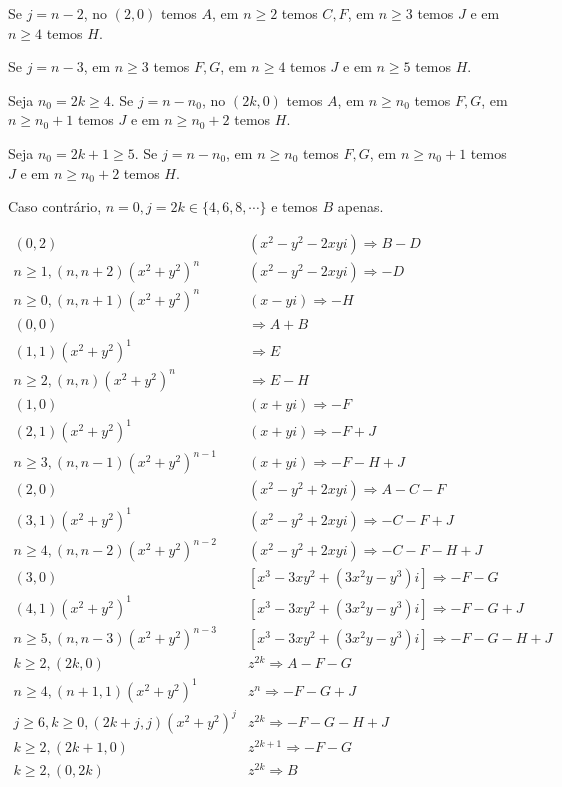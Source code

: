 \documentclass[10pt,a4paper]{article}
\begin{document}
 Se $j = n - 2$, no $(2,0)$ temos $A$, em $n \ge 2$ temos $C, F$, em $n \ge 3$ temos $J$ e em $n \ge 4$ temos $H$.

 Se $j = n - 3$, em $n \ge 3$ temos $F, G$, em $n \ge 4$ temos $J$ e em $n \ge 5$ temos $H$.

 Seja $n_0 = 2k \ge 4$. Se $j = n - n_0$, no $(2k,0)$ temos $A$, em $n \ge n_0$ temos $F, G$, em $n \ge n_0 + 1$ temos $J$ e em $n \ge n_0 + 2$ temos $H$.

 Seja $n_0 = 2k + 1 \ge 5$. Se $j = n - n_0$, em $n \ge n_0$ temos $F, G$, em $n \ge n_0 + 1$ temos $J$ e em $n \ge n_0 + 2$ temos $H$.

 Caso contr\'ario, $n = 0, j = 2k \in \{ 4,6,8,\cdots \}$ e temos $B$ apenas.

 \begin{align*}
 (0,2) &(x^2 - y^2 - 2xyi) \Rightarrow B - D \\
 n \ge 1, (n,n+2) (x^2 + y^2)^n &(x^2 - y^2 - 2xyi) \Rightarrow - D \\
 n \ge 0, (n,n+1) (x^2 + y^2)^n &(x - yi) \Rightarrow - H \\
 (0,0) &\Rightarrow A + B \\
 (1,1) (x^2 + y^2)^1 &\Rightarrow E \\
 n \ge 2, (n,n) (x^2 + y^2)^n &\Rightarrow E - H \\
 (1,0) &(x +yi) \Rightarrow - F \\
 (2,1) (x^2 + y^2)^1 &(x + yi) \Rightarrow - F + J \\
 n \ge 3, (n,n-1) (x^2 + y^2)^{n - 1} &(x + yi) \Rightarrow - F - H + J \\
 (2,0) &(x^2 - y^2 + 2xyi) \Rightarrow A - C - F \\
 (3,1) (x^2 + y^2)^1 &(x^2 - y^2 + 2xyi) \Rightarrow - C - F + J \\
    n \ge 4, (n,n-2) (x^2 + y^2)^{n - 2} &(x^2 - y^2 + 2xyi) \Rightarrow - C - F - H + J \\
    (3,0) &[x^3 - 3xy^2 + (3x^2y - y^3)i] \Rightarrow - F - G \\
    (4,1) (x^2 + y^2)^1 &[x^3 - 3xy^2 + (3x^2y - y^3)i] \Rightarrow - F - G + J \\
    n \ge 5, (n,n-3) (x^2 + y^2)^{n - 3} &[x^3 - 3xy^2 + (3x^2y - y^3)i] \Rightarrow - F - G - H + J \\
    k \ge 2, (2k,0) &z^{2k} \Rightarrow A - F - G \\
    n \ge 4, (n + 1,1) (x^2 + y^2)^1 &z^n \Rightarrow - F - G + J \\
    j \ge 6, k \ge 0, (2k + j, j) (x^2 + y^2)^j &z^{2k} \Rightarrow - F - G - H + J \\
    k \ge 2, (2k + 1,0) &z^{2k + 1} \Rightarrow - F - G \\
    k \ge 2, (0, 2k) &z^{2k} \Rightarrow B
    \end{align*}
\end{document}
